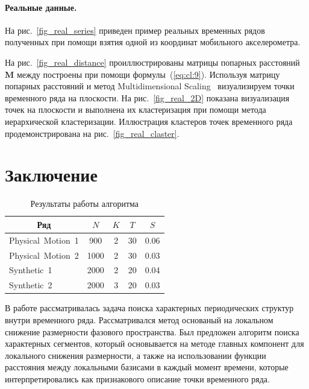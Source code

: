 \documentclass[12pt, twoside]{article}
\numberwithin{equation}{section}
\begin{document}
\paragraph{Реальные данные.}

На рис.~\ref{fig_real_series} приведен пример реальных временных рядов полученных при помощи взятия одной из координат мобильного акселерометра. 



На рис.~\ref{fig_real_distance} проиллюстрированы матрицы попарных расстояний $\textbf{M}$ между построены при помощи формулы~(\ref{eq:cl:9}). Используя матрицу попарных расстояний и метод Multidimensional Scaling~\cite{Borg2005} визуализируем точки временного ряда на плоскости. На рис.~\ref{fig_real_2D} показана визуализация точек на плоскости и выполнена их кластеризация при помощи метода иерархической кластеризации. Иллюстрация кластеров точек временного ряда продемонстрирована на рис.~\ref{fig_real_claster}.





\section{Заключение}
\begin{table}[h!t]
\begin{center}
\caption{Результаты работы алгоритма}
\label{table_2}
\begin{tabular}{|c|c|c|c|c|}
\hline
	Ряд & $N$& $K$& $T$& $S$\\
	\hline
	\multicolumn{1}{|l|}{Physical~Motion~1}
	& 900& 2& 30& 0.06\\
	\hline
	\multicolumn{1}{|l|}{Physical~Motion~2}
	& 1000& 2& 30& 0.03\\
	\hline
	\multicolumn{1}{|l|}{Synthetic~1}
	& 2000& 2& 20& 0.04\\
	\hline
	\multicolumn{1}{|l|}{Synthetic~2}
	& 2000& 3& 20& 0.03\\
\hline

\end{tabular}
\end{center}
\end{table}

В работе рассматривалась задача поиска характерных периодических структур внутри временного ряда. Рассматривался метод основаный на локальном снижение размерности фазового пространства. Был предложен алгоритм поиска характерных сегментов, который основывается на методе главных компонент для локального снижения размерности, а также на использовании функции расстояния между локальными базисами в каждый момент времени, которые интерпретировались как признакового описание точки временного ряда.
\end{document}

